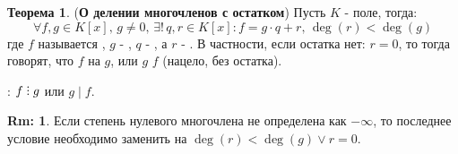 \documentclass[12pt]{article}
\theoremstyle{definition}
\newtheorem{rem}{Rm:}
\newtheorem{theorem}{Теорема}
\DeclareRobustCommand{\divby}{%
	\mathrel{\text{\vbox{\baselineskip.65ex\lineskiplimit0pt\hbox{.}\hbox{.}\hbox{.}}}}%
}
\begin{document}
\begin{theorem}(\textbf{О делении многочленов с остатком})
	Пусть $K$ - поле, тогда: 
	$$
		\forall f,g \in K[x], \, g \neq 0, \, \exists ! \, q,r \in K[x] \colon f = g{\cdot}q + r, \, \deg(r) < \deg(g)
	$$
	где $f$ называется , $g$ - , $q$ - , а $r$ - . В частности, если остатка нет: $r = 0$, то тогда говорят, что $f$  на $g$, или $g$  $f$ (нацело, без остатка).
	
	\textbf{}: $f \divby g$ или $g \mid f$.
\end{theorem}
\begin{rem}
	Если степень нулевого многочлена не определена как $-\infty$, то последнее условие необходимо заменить на $\deg(r) < \deg(g) \vee r = 0$.
\end{rem}
\end{document}
